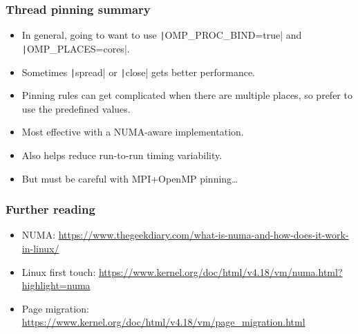\documentclass[aspectratio=169]{beamer}
\begin{document}
\begin{frame}
\frametitle{Thread pinning summary}
\begin{itemize}
  \item In general, going to want to use \texttt|OMP_PROC_BIND=true| and \texttt|OMP_PLACES=cores|.
  \item Sometimes \texttt|spread| or \texttt|close| gets better performance.
  \item Pinning rules can get complicated when there are multiple places, so prefer to use the predefined values.
  \item Most effective with a NUMA-aware implementation.
  \item Also helps reduce run-to-run timing variability.
  \item But must be careful with MPI+OpenMP pinning\dots
\end{itemize}
\end{frame}


\begin{frame}
\frametitle{Further reading}
\begin{itemize}
  \item NUMA: \url{https://www.thegeekdiary.com/what-is-numa-and-how-does-it-work-in-linux/}
  \item Linux first touch: \url{https://www.kernel.org/doc/html/v4.18/vm/numa.html?highlight=numa}
  \item Page migration: \url{https://www.kernel.org/doc/html/v4.18/vm/page_migration.html}
\end{itemize}


\end{frame}
\end{document}
